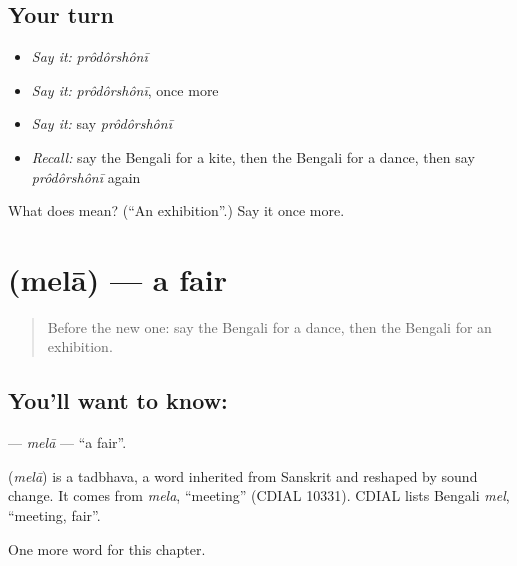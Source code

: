 \subsection*{Your turn}
\begin{itemize}
\raggedright
  \item \emph{Say it:} \emph{prôdôrshônī}
  \item \emph{Say it:} \emph{prôdôrshônī}, once more
  \item \emph{Say it:} say \emph{prôdôrshônī}
  \item \emph{Recall:} say the Bengali for a kite, then the Bengali for a dance, then say \emph{prôdôrshônī} again
\end{itemize}

\begin{tcolorbox}[breakable,colback=teal!4,colframe=teal!35!black,title={Before you move on}]
What does  mean? (\textquotedblleft{}An exhibition\textquotedblright{}.) Say it once more.
\end{tcolorbox}
\section[\texorpdfstring{\bn{মেলা} (melā)}{মেলা (melā)}]{ (melā) — a fair}

\label{lesson:BN-C251-mela}



\begin{quote}
Before the new one: say the Bengali for a dance, then the Bengali for an exhibition.
\end{quote}

\subsection*{You'll want to know: }
\textbf{} — \emph{melā} — \textquotedblleft{}a fair\textquotedblright{}.

\begin{cousinweb}
\textbf{} (\emph{melā}) is a tadbhava, a word inherited from Sanskrit and reshaped by sound change. It comes from \emph{mela}, \textquotedblleft{}meeting\textquotedblright{} (CDIAL 10331). CDIAL lists Bengali \emph{mel}, \textquotedblleft{}meeting, fair\textquotedblright{}.
\end{cousinweb}

\begin{grammarlens}[title={What you've built}]
One more word for this chapter.
\end{grammarlens}

